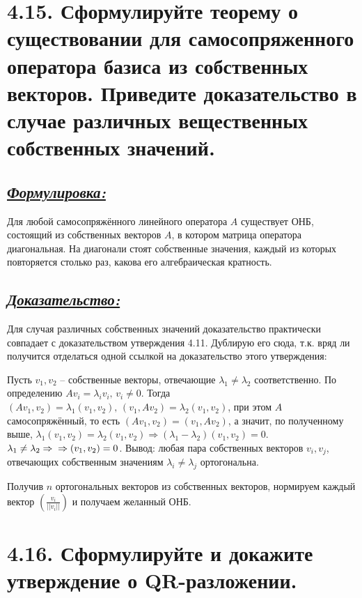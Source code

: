 \documentclass{article}
\begin{document}
\section*{\LARGE 4.15. Сформулируйте теорему о существовании для самосопряженного оператора базиса из собственных векторов. Приведите доказательство в случае различных вещественных собственных значений. }
\subsection*{\Large \underline{\textit{Формулировка: }}}
Для любой самосопряжённого линейного оператора $A$ существует ОНБ, состоящий из собственных векторов $A$, в котором матрица оператора диагональная. На диагонали стоят собственные значения, каждый из которых повторяется столько раз, какова его алгебраическая кратность.

\subsection*{\Large \underline{\textit{Доказательство: }}}
Для случая различных собственных значений доказательство практически совпадает с доказательством утверждения 4.11. Дублирую его сюда, т.к. вряд ли получится отделаться одной ссылкой на доказательство этого утверждения:

Пусть $v_1, v_2$ -- собственные векторы, отвечающие $\lambda_1 \ne \lambda_2$ соответственно. По определению $Av_i = \lambda_iv_i,\, v_i \ne 0$. Тогда $(Av_1, v_2) = \lambda_1(v_1, v_2),\, (v_1, Av_2) = \lambda_2(v_1, v_2)$, при этом $A$ самосопряжённый, то есть $(Av_1, v_2) = (v_1, Av_2)$, а значит, по полученному выше, $\lambda_1(v_1, v_2) = \lambda_2(v_1, v_2) \Rightarrow (\lambda_1 - \lambda_2)(v_1, v_2) = 0$. $\lambda_1 \ne \lambda_2 \Rightarrow \newline \Rightarrow (v_1, v_2) = 0$. Вывод: любая пара собственных векторов $v_i, v_j$, отвечающих собственным значениям $\lambda_i \ne \lambda_j$ ортогональна.

Получив $n$ ортогональных векторов из собственных векторов, нормируем каждый вектор $(\frac{v_i}{||v_i||})$ и получаем желанный ОНБ.

\section*{\LARGE 4.16. Сформулируйте и докажите утверждение о QR-разложении. }
\end{document}
